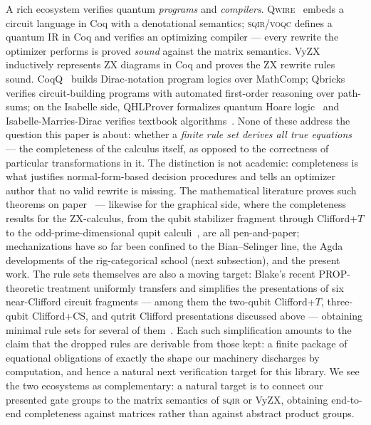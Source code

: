 A rich ecosystem verifies quantum \emph{programs} and \emph{compilers}.
\textsc{Qwire}~\cite{paykin2017qwire} embeds a circuit language in Coq
with a denotational semantics; \textsc{sqir}/\textsc{voqc}
\cite{hietala2021voqc,hietala2021proving} defines a quantum IR in Coq and
verifies an optimizing compiler --- every rewrite the optimizer performs
is proved \emph{sound} against the matrix semantics.
VyZX~\cite{lehmann2025vyzx} inductively represents ZX diagrams in Coq and
proves the ZX rewrite rules sound.  CoqQ~\cite{zhou2023coqq} builds
Dirac-notation program logics over MathComp;
Qbricks~\cite{chareton2021qbricks} verifies circuit-building programs
with automated first-order reasoning over path-sums; on the Isabelle
side, QHLProver formalizes quantum Hoare logic~\cite{liu2019quantum} and
Isabelle-Marries-Dirac verifies textbook algorithms~\cite{bordg2020dirac}.
None of these address the question this paper is about: whether a
\emph{finite rule set derives all true equations} --- the completeness of
the calculus itself, as opposed to the correctness of particular
transformations in it.  The distinction is not academic: completeness is
what justifies normal-form-based decision procedures and tells an
optimizer author that no valid rewrite is missing.  The mathematical
literature proves such theorems on
paper~\cite{selinger2015clifford,clement2023complete,clement2024minimal,
li2025qutrit,clement2026realcliffordch} --- likewise for the graphical
side, where the completeness results for the ZX-calculus, from the qubit
stabilizer fragment through Clifford+$T$ to the odd-prime-dimensional
qupit calculi~\cite{backens2014zx,jeandel2018zx,booth2022qupitzx,
poor2023travaganza}, are all pen-and-paper; mechanizations have so far
been confined to the Bian--Selinger line, the Agda developments of the
rig-categorical school (next subsection), and the present work.  The rule sets themselves are
also a moving target: Blake's recent PROP-theoretic treatment uniformly
transfers and simplifies the presentations of six near-Clifford circuit
fragments --- among them the two-qubit Clifford+$T$, three-qubit
Clifford+CS, and qutrit Clifford presentations discussed above ---
obtaining minimal rule sets for several of
them~\cite{blake2026simpler}.  Each such simplification amounts to the
claim that the dropped rules are derivable from those kept: a finite
package of equational obligations of exactly the shape our
 machinery discharges by computation, and hence a
natural next verification target for this library.  We see the two
ecosystems as complementary: a natural target is to connect our presented
gate groups to the matrix semantics of \textsc{sqir} or VyZX, obtaining
end-to-end completeness against matrices rather than against abstract
product groups.

